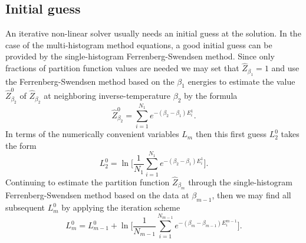 \subsection{Initial guess}

An iterative non-linear solver usually needs an initial guess at the solution. In the case of the multi-histogram method equations,
a good initial guess can be provided by the single-histogram Ferrenberg-Swendsen
method. Since only fractions of partition function values are needed we may set that $\hat{Z}_{\beta_1}=1$ and use the Ferrenberg-Swendsen method based on
the $\beta_1$ energies to estimate the value $\hat{Z}_{\beta_2}^0$ of $\hat{Z}_{\beta_2}$ at neighboring inverse-temperature $\beta_2$ by the formula
\begin{equation}
    \label{eq:Monte:Reweighting:MFS:guess:Zb2}
    \hat{Z}_{\beta_2}^0 = \sum_{i=1}^{N_1}e^{-(\beta_2-\beta_1)E^1_i}.
\end{equation}
In terms of the numerically convenient variables $L_m$ then this first guess $L_{2}^0$ takes the form
\begin{equation}
    \label{eq:Monte:Reweighting:MFS:guess:L2}
    L_{2}^0 = \ln\Big[\frac{1}{N_1}\sum_{i=1}^{N_1}e^{-(\beta_2-\beta_1)E_i^1}\Big].
\end{equation}
Continuing to estimate the partition function $\hat{Z}_{\beta_m}$ through the single-histogram Ferrenberg-Swendsen method based on the data at $\beta_{m-1}$,
then we may find all subsequent $L_{m}^0$ by applying the iteration scheme
\begin{equation}
    \label{eq:Monte:Reweighting:MFS:guess:LIteration}
    L_{m}^0 = L_{m-1}^0 + \ln\Big[\frac{1}{N_{m-1}}\sum_{i=1}^{N_{m-1}}e^{-(\beta_m-\beta_{m-1})E_i^{m-1}}\Big].
\end{equation}

